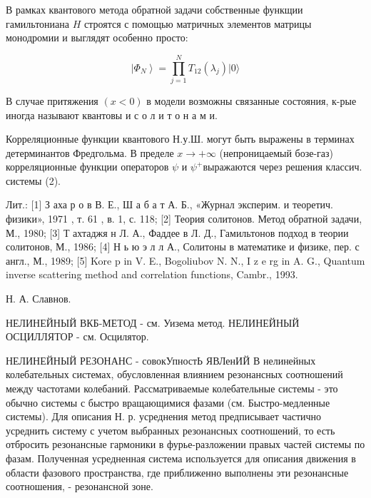 \documentclass[10pt]{article}
\begin{document}
В рамках квантового метода обратной задачи собственные функщии гамильтониана $H$ строятся с помощью матричных элементов матрицы монодромии и выглядят особенно просто:



\[

\left|\Phi_{N}\right\rangle=\prod_{j=1}^{N} T_{12}\left(\lambda_{j}\right)|0\rangle

\]



В случае притяжения $(x<0)$ в модели возможны связанные состояния, к-рые иногда называют квантовы и с о л и т о н а м и.



Корреляционные функции квантового Н.у.Ш. могут быть выражены в терминах детерминантов Фредгольма. В пределе $x \rightarrow+\infty$ (непроницаемый бозе-газ) корреляционные функции операторов $\psi$ и $\psi^{+}$выражаются через решения классич. системы (2).



Лит.: [1] З аха р о в В. Е., Ш а б а т А. Б., «Журнал эксперим. и теоретич. физики», 1971 , т. 61 , в. 1, с. 118; [2] Теория солитонов. Метод обратной задачи, М., 1980; [3] Т ахтаджя н Л. А., Фаддее в Л. Д., Гамильтонов подход в теории солитонов, М., 1986; [4] Н ь ю э л л А., Солитоны в математике и физике, пер. с англ., М., 1989; [5] Kore p in V. E., Bogoliubov N. N., I z e rg in A. G., Quantum inverse scattering method and correlation functions, Cambr., 1993.



Н. А. Славнов.



НЕЛИНЕЙНЫЙ ВКБ-МЕТОД - см. Уизема метод. НЕЛИНЕЙНЫЙ ОСЦИЛЛЯТОР - см. Осцилятор.



НЕЛИНЕЙНЫЙ РЕЗОНАНС - совокУпностЬ ЯВЛенИЙ В нелинейных колебательных системах, обусловленная влиянием резонансных соотношений между частотами колебаний. Рассматриваемые колебательные системы - это обычно системы с быстро вращающимися фазами (см. Быстро-медленные системы). Для описания Н. р. усреднения метод предписывает частично усреднить систему с учетом выбранных резонансных соотношений, то есть отбросить резонансные гармоники в фурье-разложении правых частей системы по фазам. Полученная усредненная система используется для описания движения в области фазового пространства, где приближенно выполнены эти резонансные соотношения, - резонансной зоне.
\end{document}
